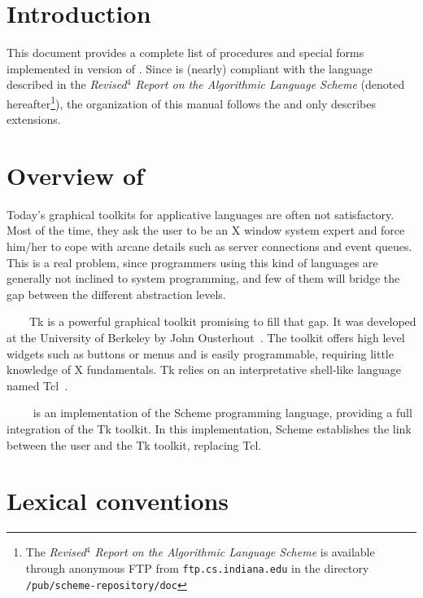 %
%
%

\section*{Introduction}

This document provides a complete list of procedures and special forms
implemented in version {\stkversion} of {\stk}. Since {\stk} is (nearly) 
compliant with the language described in the {\em Revised$^{4}$ Report on the
Algorithmic Language Scheme} (denoted {\rrrr} hereafter{\footnote{The {\em
Revised$^{4}$ Report on the Algorithmic Language Scheme} is available
through anonymous FTP from {\tt ftp.cs.indiana.edu} in the directory
{\tt /pub/scheme-repository/doc}}})\cite{R4RS}, the organization of
this manual follows the {\rrrr} and only describes extensions.

\section{Overview of \stk}

Today's graphical toolkits for applicative languages are often not
satisfactory. Most of the time, they ask the user to be an X window system
 expert and force him/her to cope with arcane
details such as server connections and event queues. This is a real
problem, since programmers using this kind of languages are generally not
inclined to system programming, and few of them will bridge the gap between
the different abstraction levels.


~~~~Tk is a powerful graphical tool\-kit
promising to fill that gap. It was developed at the University of Berkeley
by John Ousterhout~\cite{Ouster-Tk}. The toolkit offers high level widgets
such as buttons or menus and is easily programmable, requiring little
knowledge of X fundamentals. Tk relies on an interpretative shell-like
language named Tcl~\cite{Ouster-Tcl}.

~~~~{\stk} is an implementation of the Scheme programming language,
providing a full integration of the Tk toolkit. In this implementation,
Scheme establishes the link between the user and the Tk toolkit, replacing
Tcl.


\section{Lexical conventions}

